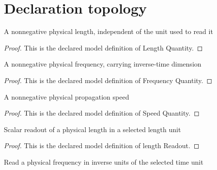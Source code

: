 \section{Declaration topology}
\begin{definition}
  \label{def:physics:phyx-mini-0176:phyxminiproblems-problemphyxmini0176-lengthquantity}
  A nonnegative physical length, independent of the unit used to read it
\end{definition}
\begin{proof}
  This is the declared model definition of Length Quantity.
\end{proof}
\begin{definition}
  \label{def:physics:phyx-mini-0176:phyxminiproblems-problemphyxmini0176-frequencyquantity}
  A nonnegative physical frequency, carrying inverse-time dimension
\end{definition}
\begin{proof}
  This is the declared model definition of Frequency Quantity.
\end{proof}
\begin{definition}
  \label{def:physics:phyx-mini-0176:phyxminiproblems-problemphyxmini0176-speedquantity}
  A nonnegative physical propagation speed
\end{definition}
\begin{proof}
  This is the declared model definition of Speed Quantity.
\end{proof}
\begin{definition}
  \label{def:physics:phyx-mini-0176:phyxminiproblems-problemphyxmini0176-lengthreadout}
  Scalar readout of a physical length in a selected length unit
\end{definition}
\begin{proof}
  This is the declared model definition of length Readout.
\end{proof}
\begin{definition}
  \label{def:physics:phyx-mini-0176:phyxminiproblems-problemphyxmini0176-frequencyreadout}
  Read a physical frequency in inverse units of the selected time unit
\end{definition}
